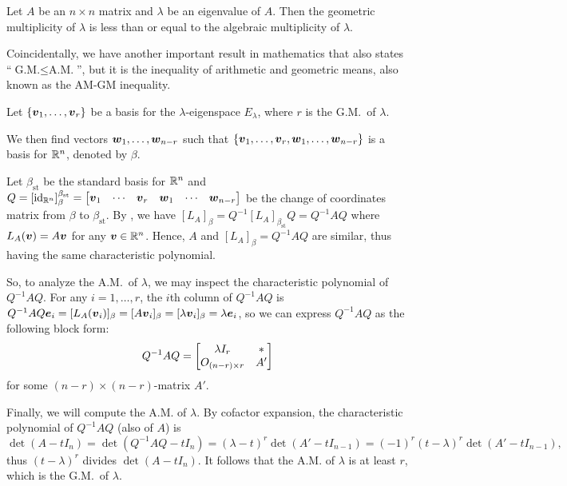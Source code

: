 \begin{enumerate}
\begin{theorem}
\label{thm:gm-leq-am}
Let \(A\) be an \(n\times n\) matrix and \(\lambda\) be an eigenvalue of \(A\).
Then the geometric multiplicity of \(\lambda\) is less than or equal to the
algebraic multiplicity of \(\lambda\).
\end{theorem}
\begin{note}
Coincidentally, we have another important result in mathematics that also
states ``\(\text{G.M.}\leq\text{A.M.}\)'', but it is the inequality of
arithmetic and geometric means, also known as the AM-GM inequality.
\end{note}

\begin{pf}
Let \(\{\vb*{v}_1,\dotsc,\vb*{v}_r\}\) be a basis for the
\(\lambda\)-eigenspace \(E_{\lambda}\), where \(r\) is the G.M.\ of \(\lambda\).

We then find vectors \(\vb*{w}_1,\dotsc,\vb*{w}_{n-r}\) such that
\(\{\vb*{v}_1,\dotsc,\vb*{v}_r,\vb*{w}_1,\dotsc,\vb*{w}_{n-r}\}\) is a
basis for \(\mathbb{R}^n\), denoted by \(\beta\).

Let \(\beta_{\mathrm{st}}\) be the standard basis for \(\mathbb{R}^n\) and
\(Q=[\id_{\R^n}]_{\beta}^{\beta_{\mathrm{st}}}=\mqty[\vect{v}_1&\cdots&\vect{v}_r&\vect{w}_1&\cdots&\vect{w}_{n-r}]\)
be the change of coordinates matrix from \(\beta\) to \(\beta_{\mathrm{st}}\).
By , we have \(
[L_A]_{\beta}=Q^{-1}[L_A]_{\beta_{\mathrm{st}}}Q=Q^{-1}AQ\) where
\(L_A(\vb*{v})=A\vb*{v}\) for any \(\vb*{v}\in\mathbb{R}^n\). Hence, \(A\) and
\([L_A]_{\beta}=Q^{-1}AQ\) are similar, thus having the same characteristic
polynomial.

So, to analyze the A.M.\ of \(\lambda\), we may inspect the characteristic
polynomial of \(Q^{-1}AQ\). For any \(i=1,\dotsc,r\), the \(i\)th column of
\(Q^{-1}AQ\) is
\(Q^{-1}AQ\vb*{e}_i=[L_A(\vb*{v}_i)]_{\beta}=[A\vb*{v}_i]_{\beta}=[\lambda
\vb*{v}_i]_{\beta}=\lambda\vb*{e}_i\), so we can express \(Q^{-1}AQ\) as the
following block form:
\[
Q^{-1}AQ=\mqty[\lambda I_r&*\\ O_{(n-r)\times r}&A']
\]
for some \((n-r)\times (n-r)\)-matrix \(A'\).

Finally, we will compute the A.M. of \(\lambda\). By cofactor expansion, the
characteristic polynomial of \(Q^{-1}AQ\) (also of \(A\)) is
\[
\det(A-tI_n)=\det(Q^{-1}AQ-tI_n)=(\lambda-t)^{r}\det(A'-tI_{n-1})
=(-1)^{r}(t-\lambda)^r\det(A'-tI_{n-1}),
\]
thus \((t-\lambda)^r\) divides \(\det(A-tI_n)\). It follows that the A.M. of
\(\lambda\) is at least \(r\), which is the G.M.\ of \(\lambda\).
\end{pf}


\end{enumerate}
